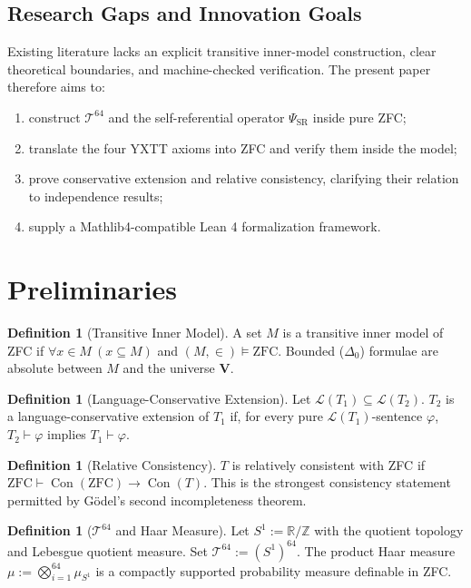 \documentclass[12pt,a4paper]{article}
\theoremstyle{plain}
\theoremstyle{definition}
\newtheorem{definition}[theorem]{Definition}
\newcommand{\Tsixtyfour}{\mathcal{T}^{64}}
\newcommand{\R}{\mathbb{R}}
\newcommand{\Z}{\mathbb{Z}}
\newcommand{\PSR}{\Psi_{\mathrm{SR}}}
\newcommand{\ZFC}{\mathrm{ZFC}}
\newcommand{\Con}{\operatorname{Con}}
\newcommand{\V}{\mathbf{V}}
\begin{document}
\subsection{Research Gaps and Innovation Goals}
Existing literature lacks an explicit transitive inner-model construction, clear theoretical boundaries, and machine-checked verification. The present paper therefore aims to:
\begin{enumerate}
  \item construct $\Tsixtyfour$ and the self-referential operator $\PSR$ inside pure ZFC;
  \item translate the four YXTT axioms into ZFC and verify them inside the model;
  \item prove conservative extension and relative consistency, clarifying their relation to independence results;
  \item supply a Mathlib4-compatible Lean 4 formalization framework.
\end{enumerate}

\section{Preliminaries}
\label{sec:preliminaries}

\begin{definition}[Transitive Inner Model]
A set $M$ is a transitive inner model of ZFC if $\forall x\in M\ (x\subseteq M)$ and $(M,\in)\vDash\ZFC$. Bounded ($\Delta_0$) formulae are absolute between $M$ and the universe $\V$.
\end{definition}

\begin{definition}[Language-Conservative Extension]
Let $\mathcal{L}(T_1)\subseteq\mathcal{L}(T_2)$. $T_2$ is a language-conservative extension of $T_1$ if, for every pure $\mathcal{L}(T_1)$-sentence $\varphi$, $T_2\vdash\varphi$ implies $T_1\vdash\varphi$.
\end{definition}

\begin{definition}[Relative Consistency]
$T$ is relatively consistent with ZFC if $\ZFC\vdash\Con(\ZFC)\to\Con(T)$. This is the strongest consistency statement permitted by Gödel's second incompleteness theorem.
\end{definition}

\begin{definition}[$\Tsixtyfour$ and Haar Measure]
Let $S^1:=\R/\Z$ with the quotient topology and Lebesgue quotient measure. Set $\Tsixtyfour:=(S^1)^{64}$. The product Haar measure $\mu:=\bigotimes_{i=1}^{64}\mu_{S^1}$ is a compactly supported probability measure definable in ZFC.
\end{definition}
\end{document}
